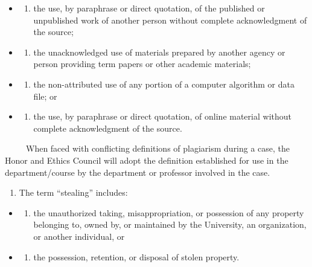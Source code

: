 \documentclass[
]{book}
\providecommand{\tightlist}{%
  \setlength{\itemsep}{0pt}\setlength{\parskip}{0pt}}
\begin{document}
\begin{itemize}
\tightlist
\item
  \begin{enumerate}
  \def\labelenumi{(\alph{enumi})}
  \tightlist
  \item
    the use, by paraphrase or direct quotation, of the published or unpublished work of another person without complete acknowledgment of the source;
  \end{enumerate}
\item
  \begin{enumerate}
  \def\labelenumi{(\alph{enumi})}
  \setcounter{enumi}{1}
  \tightlist
  \item
    the unacknowledged use of materials prepared by another agency or person providing term papers or other academic materials;
  \end{enumerate}
\item
  \begin{enumerate}
  \def\labelenumi{(\alph{enumi})}
  \setcounter{enumi}{2}
  \tightlist
  \item
    the non-attributed use of any portion of a computer algorithm or data file; or
  \end{enumerate}
\item
  \begin{enumerate}
  \def\labelenumi{(\alph{enumi})}
  \setcounter{enumi}{3}
  \tightlist
  \item
    the use, by paraphrase or direct quotation, of online material without complete acknowledgment of the source.
  \end{enumerate}
\end{itemize}

~~~~~When faced with conflicting definitions of plagiarism during a case, the Honor and Ethics Council will adopt the definition established for use in the department/course by the department or professor involved in the case.

\begin{enumerate}
\def\labelenumi{\arabic{enumi}.}
\setcounter{enumi}{2}
\tightlist
\item
  The term ``stealing'' includes:
\end{enumerate}

\begin{itemize}
\tightlist
\item
  \begin{enumerate}
  \def\labelenumi{(\alph{enumi})}
  \tightlist
  \item
    the unauthorized taking, misappropriation, or possession of any property belonging to, owned by, or maintained by the University, an organization, or another individual, or
  \end{enumerate}
\item
  \begin{enumerate}
  \def\labelenumi{(\alph{enumi})}
  \setcounter{enumi}{1}
  \tightlist
  \item
    the possession, retention, or disposal of stolen property.
  \end{enumerate}
\end{itemize}
\end{document}
